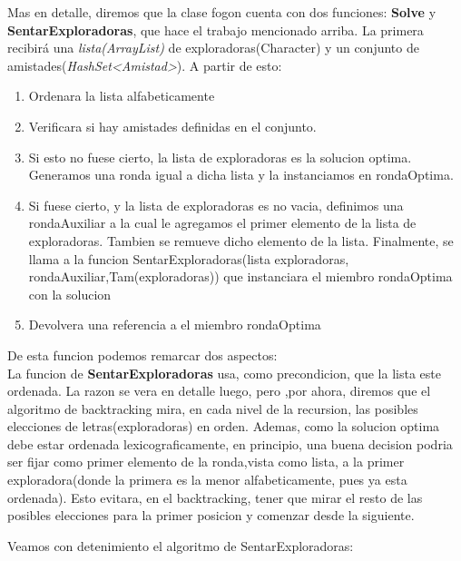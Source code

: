 \documentclass[10pt, a4paper]{article}
\begin{document}
Mas en detalle, diremos que la clase fogon cuenta con dos funciones: \textbf{Solve} y \textbf{SentarExploradoras}, que hace el trabajo mencionado arriba.
La primera recibirá una \textit{lista(ArrayList)} de exploradoras(Character) y un conjunto de amistades(\textit{HashSet<Amistad>}). A partir de esto:
\begin{enumerate}

\item Ordenara la lista alfabeticamente

\item Verificara si hay amistades definidas en el conjunto. 

\item Si esto no fuese cierto, la lista de exploradoras es la solucion optima. Generamos una ronda igual a dicha lista y la instanciamos en rondaOptima.

\item Si fuese cierto, y la lista de exploradoras es no vacia, definimos una rondaAuxiliar a la cual le agregamos el primer elemento de la lista de exploradoras. Tambien se remueve dicho elemento de la lista. Finalmente, se llama a la funcion SentarExploradoras(lista exploradoras, rondaAuxiliar,Tam(exploradoras)) que instanciara el miembro rondaOptima con la solucion

\item Devolvera una referencia a el miembro rondaOptima
\end{enumerate}
  
De esta funcion podemos remarcar dos aspectos:\\

La funcion de \textbf{SentarExploradoras} usa, como precondicion, que la lista este ordenada. La razon se vera en detalle luego, pero ,por ahora, diremos que el algoritmo de backtracking mira, en cada nivel de la recursion, las posibles elecciones de letras(exploradoras) en orden.
Ademas, como la solucion optima debe estar ordenada lexicograficamente, en principio, una buena decision podria ser fijar como primer elemento de la ronda,vista como lista, a la primer exploradora(donde la primera es la menor alfabeticamente, pues ya esta ordenada). Esto evitara, en el backtracking, tener que mirar el resto de las posibles elecciones para la primer posicion y comenzar desde la siguiente.

Veamos con detenimiento el algoritmo de SentarExploradoras:
\end{document}
